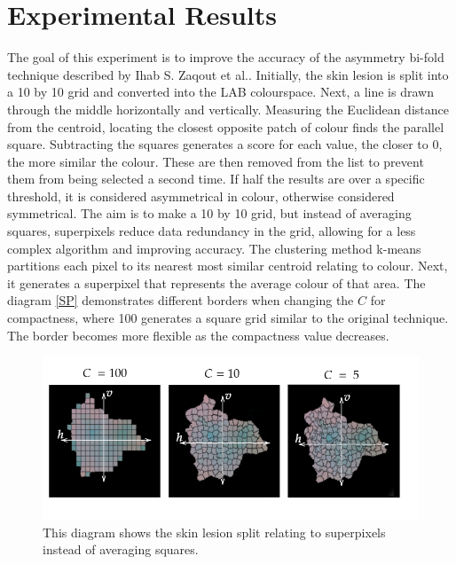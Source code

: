 \section{Experimental Results}
The goal of this experiment is to improve the accuracy of the asymmetry bi-fold technique described by Ihab S. Zaqout et al.\cite{Zaqout2016}. Initially, the skin lesion is split into a 10 by 10 grid and converted into the LAB colourspace. Next, a line is drawn through the middle horizontally and vertically. Measuring the Euclidean distance from the centroid, locating the closest opposite patch of colour finds the parallel square. Subtracting the squares generates a score for each value, the closer to 0, the more similar the colour. These are then removed from the list to prevent them from being selected a second time. If half the results are over a specific threshold, it is considered asymmetrical in colour, otherwise considered symmetrical. The aim is to make a 10 by 10 grid, but instead of averaging squares, superpixels reduce data redundancy in the grid, allowing for a less complex algorithm and improving accuracy. The clustering method k-means partitions each pixel to its nearest most similar centroid relating to colour. Next, it generates a superpixel that represents the average colour of that area. The diagram \ref{SP} demonstrates different borders when changing the $C$ for compactness, where 100 generates a square grid similar to the original technique. The border becomes more flexible as the compactness value decreases.

\begin{figure} 
\centering
\includegraphics[scale=0.6]{images/superpixels.png}
\caption{This diagram shows the skin lesion split relating to superpixels instead of averaging squares.}
\end{figure}\label{SP}

